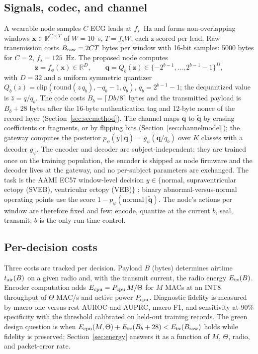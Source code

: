\documentclass[journal]{IEEEtran}
\newcommand{\bz}{\mathbf{z}}
\newcommand{\bx}{\mathbf{x}}
\newcommand{\bq}{\mathbf{q}}
\newcommand{\R}{\mathbb{R}}
\begin{document}
\subsection{Signals, codec, and channel}
A wearable node samples $C$ ECG leads at $f_s$~Hz and forms non-overlapping windows $\bx\in\R^{C\times T}$ of $W=10$~s, $T=f_sW$, each z-scored per lead. Raw transmission costs $B_{\rm raw}=2CT$ bytes per window with 16-bit samples: 5000 bytes for $C=2$, $f_s=125$~Hz. The proposed node computes
\begin{equation}
\bz=f_\phi(\bx)\in\R^{D},\qquad \bq=Q_b(\bz)\in\{-2^{b-1},\dots,2^{b-1}-1\}^{D},
\label{eq:enc}
\end{equation}
with $D=32$ and a uniform symmetric quantizer $Q_b(z)=\mathrm{clip}(\mathrm{round}(z\,q_b),-q_b-1,q_b)$, $q_b=2^{b-1}-1$; the dequantized value is $\hat z=q/q_b$. The code costs $B_b=\lceil Db/8\rceil$ bytes and the transmitted payload is $B_b+28$ bytes after the 16-byte authentication tag and 12-byte nonce of the record layer (Section~\ref{sec:secmethod}). The channel maps $\bq$ to $\tilde{\bq}$ by erasing coefficients or fragments, or by flipping bits (Section~\ref{sec:channelmodel}); the gateway computes the posterior $p_\psi(y\,|\,\tilde{\bq})=g_\psi(\tilde{\bq}/q_b)$ over $K$ classes with a decoder $g_\psi$. The encoder and decoder are subject-independent: they are trained once on the training population, the encoder is shipped as node firmware and the decoder lives at the gateway, and no per-subject parameters are exchanged. The task is the AAMI EC57 window-level decision $y\in\{$normal, supraventricular ectopy (SVEB), ventricular ectopy (VEB)$\}$ \cite{aami2012}; binary abnormal-versus-normal operating points use the score $1-p_\psi(\text{normal}\,|\,\tilde{\bq})$. The node's actions per window are therefore fixed and few: encode, quantize at the current $b$, seal, transmit; $b$ is the only run-time control.

\subsection{Per-decision costs}
Three costs are tracked per decision. Payload $B$ (bytes) determines airtime $t_{\rm air}(B)$ on a given radio and, with the transmit current, the radio energy $E_{\rm tx}(B)$. Encoder computation adds $E_{\rm cpu}=P_{\rm cpu}\,M/\Theta$ for $M$ MACs at an INT8 throughput of $\Theta$ MAC/s and active power $P_{\rm cpu}$. Diagnostic fidelity is measured by macro one-versus-rest AUROC and AUPRC, macro-F1, and sensitivity at 90\% specificity with the threshold calibrated on held-out training records. The green design question is when $E_{\rm cpu}(M,\Theta)+E_{\rm tx}(B_b+28)<E_{\rm tx}(B_{\rm raw})$ holds while fidelity is preserved; Section~\ref{sec:energy} answers it as a function of $M$, $\Theta$, radio, and packet-error rate.
\end{document}
